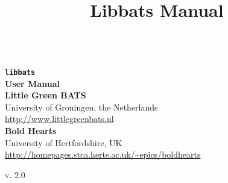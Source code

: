 \documentclass{scrbook}
\title{Libbats Manual}
\newcommand{\HRule}{\rule{\linewidth}{0.5mm}}
\begin{document}
\frontmatter

\begin{titlepage}
{\noindent
\vspace{2cm}\\
\textbf{
{\texttt{\Huge libbats}}\\[0.5cm]
{\textsf{\Huge User Manual}}\\[2.5cm]
}
\textbf{\textsf{\Large Little Green BATS}}\\
{\sf\large University of Groningen, the Netherlands}\\
{\large\url{http://www.littlegreenbats.nl}}\\[0.5cm]
\textbf{\textsf{\Large Bold Hearts}}\\
{\sf\large University of Hertfordshire, UK}\\
{\large\url{http://homepages.stca.herts.ac.uk/~epics/boldhearts}}\\[0.5cm]
\vfill
\begin{center}
{\sf\large v. 2.0}
\end{center}
}
\end{titlepage}

\tableofcontents

%

\mainmatter



%
%
%

%
%





%

\backmatter
%
%
%
%
\end{document}
